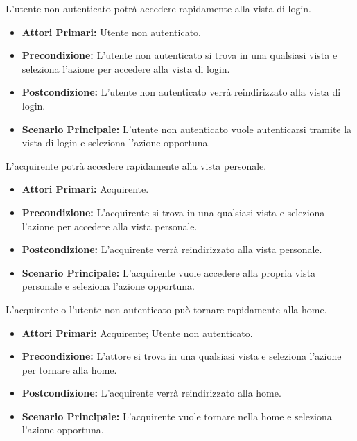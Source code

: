 
L'utente non autenticato potrà accedere rapidamente alla vista di login.
\begin{itemize}
    \item \textbf{Attori Primari:} Utente non autenticato.
    \item \textbf{Precondizione:} L'utente non autenticato si trova in una qualsiasi vista e seleziona l'azione per accedere alla vista di login.
    \item \textbf{Postcondizione:} L'utente non autenticato verrà reindirizzato alla vista di login.
    \item \textbf{Scenario Principale:} L'utente non autenticato vuole autenticarsi tramite la vista di login e seleziona l'azione opportuna. 
\end{itemize}

L'acquirente potrà accedere rapidamente alla vista personale.
\begin{itemize}
    \item \textbf{Attori Primari:} Acquirente.
    \item \textbf{Precondizione:} L'acquirente si trova in una qualsiasi vista e seleziona l'azione per accedere alla vista personale.
    \item \textbf{Postcondizione:} L'acquirente verrà reindirizzato alla vista personale.
    \item \textbf{Scenario Principale:} L'acquirente  vuole accedere alla propria vista personale e seleziona l'azione opportuna.
\end{itemize}

L'acquirente o l'utente non autenticato può tornare rapidamente alla home.
\begin{itemize}
    \item \textbf{Attori Primari:} Acquirente; Utente non autenticato.
    \item \textbf{Precondizione:} L'attore si trova in una qualsiasi vista e seleziona l'azione per tornare alla home.
    \item \textbf{Postcondizione:} L'acquirente verrà reindirizzato alla home.
    \item \textbf{Scenario Principale:} L'acquirente vuole tornare nella home e seleziona l'azione opportuna.
\end{itemize}

